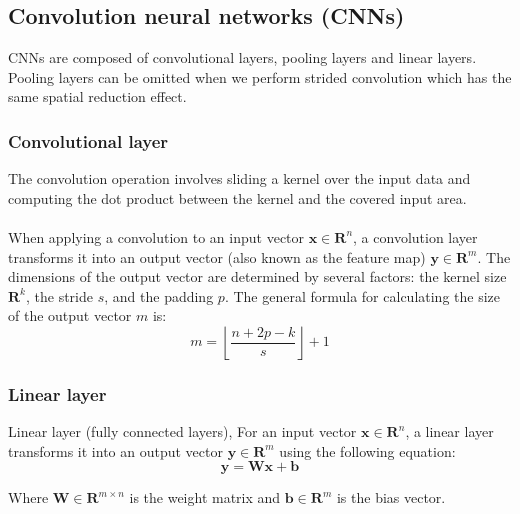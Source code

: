 \subsection{Convolution neural networks (CNNs)} 
CNNs are composed of convolutional layers, pooling layers and linear layers. Pooling layers can be omitted when we perform strided convolution which has the same spatial reduction effect.
\cite{o2015introduction} \cite{alzubaidi2021review}

\subsubsection{Convolutional layer}
The convolution operation involves sliding a kernel over the input data and computing the dot product between the kernel and the covered input area. 
\\\\
When applying a convolution to an input vector $\mathbf{x} \in \mathbf{R}^n$, a convolution layer transforms it into an output vector (also known as the feature map) $\mathbf{y} \in \mathbf{R}^m$. The dimensions of the output vector are determined by several factors: the kernel size $\mathbf{R}^k$, the stride $s$, and the padding $p$. The general formula for calculating the size of the output vector $m$ is:
\begin{equation}
	m=\left\lfloor\frac{n+2 p-k}{s}\right\rfloor+1
	\label{eq:cnn}
\end{equation}

\subsubsection{Linear layer}
Linear layer (fully connected layers), For an input vector $\mathbf{x} \in \mathbf{R}^n$, a linear layer transforms it into an output vector $\mathbf{y} \in \mathbf{R}^m$ using the following equation:
\begin{equation}
	\mathbf{y}=\mathbf{W} \mathbf{x}+\mathbf{b}
	\label{eq:linear}
\end{equation}

Where $\mathbf{W} \in \mathbf{R}^{m \times n}$ is the weight matrix and $\mathbf{b} \in \mathbf{R}^m$ is the bias vector.

